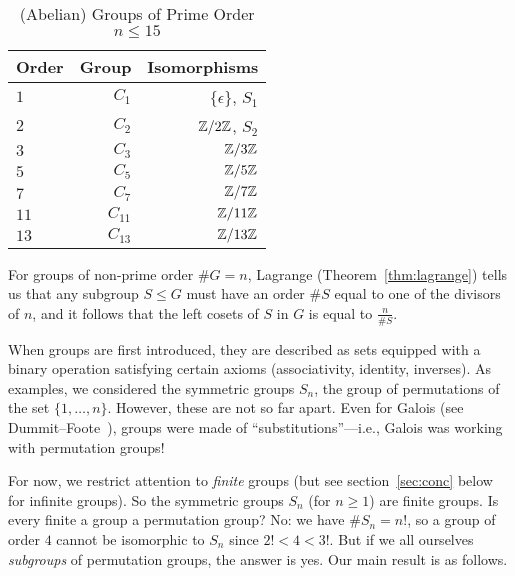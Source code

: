 \begin{center}
  \begin{table}~\label{tab:prime-groups}
    \begin{tabular}{ l r r }
      Order & Group & Isomorphisms \\
      \midrule
      $1$ & $C_1$ & $\{ \epsilon \}$, $S_1$ \\
      $2$ & $C_2$ & $\mathbb{Z}/2\mathbb{Z}$, $S_2$ \\
      $3$ & $C_3$ & $\mathbb{Z}/3\mathbb{Z}$ \\
      $5$ & $C_5$ & $\mathbb{Z}/5\mathbb{Z}$ \\
      $7$ & $C_7$ & $\mathbb{Z}/7\mathbb{Z}$ \\
      $11$ & $C_{11}$ & $\mathbb{Z}/11\mathbb{Z}$ \\
      $13$ & $C_{13}$ & $\mathbb{Z}/13\mathbb{Z}$ \\
    \end{tabular}
    \caption{(Abelian) Groups of Prime Order $n \le 15$}
  \end{table}
\end{center}

\bigskip
For groups of non-prime order $\#G = n$, Lagrange (Theorem~\ref{thm:lagrange}) tells
us that any subgroup $S \le G$ must have an order $\#S$ equal to one of the divisors of $n$,
and it follows that the left cosets of $S$ in $G$ is equal to $\frac{n}{\#S}$.

When groups are first introduced, they are described as sets equipped with a binary operation
satisfying certain axioms (associativity, identity, inverses).
As examples, we considered the symmetric groups $S_n$, the group of permutations of the set
$\{1,\dots,n\}$.  However, these are not so far apart.  Even for Galois (see 
Dummit--Foote~\cite[p.~14 (3)]{DummitFoote}), groups were made of ``substitutions''---i.e., 
Galois was working with permutation groups!  

For now, we restrict attention to \emph{finite} groups (but see section~\ref{sec:conc} below 
for infinite groups).  So the symmetric groups $S_n$ (for $n \geq 1$) are finite groups.  Is 
every finite a group a permutation group?  No: we have $\#S_n=n!$, so a group of order $4$ 
cannot be isomorphic to $S_n$ since $2! < 4 < 3!$.  But if we all ourselves \emph{subgroups} 
of permutation groups, the answer is yes.  Our main result is as follows.


